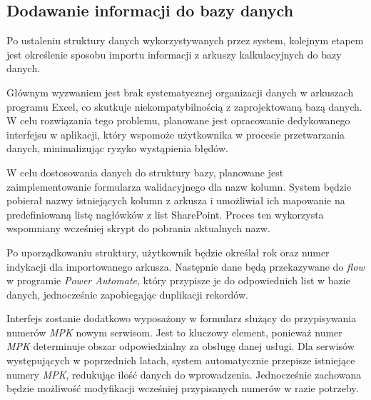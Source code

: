 \subsection{Dodawanie informacji do bazy danych}
Po ustaleniu struktury danych wykorzystywanych przez system, kolejnym etapem jest określenie sposobu importu informacji z arkuszy kalkulacyjnych do bazy danych.

Głównym wyzwaniem jest brak systematycznej organizacji danych w arkuszach programu Excel, co skutkuje niekompatybilnością z zaprojektowaną bazą danych. W celu rozwiązania tego problemu, planowane jest opracowanie dedykowanego interfejsu w aplikacji, który wspomoże użytkownika w procesie przetwarzania danych, minimalizując ryzyko wystąpienia błędów.



W celu dostosowania danych do struktury bazy, planowane jest zaimplementowanie formularza walidacyjnego dla nazw kolumn. System będzie pobierał nazwy istniejących kolumn z arkusza i umożliwiał ich mapowanie na predefiniowaną listę nagłówków z list SharePoint. Proces ten wykorzysta wspomniany wcześniej skrypt do pobrania aktualnych nazw.

Po uporządkowaniu struktury, użytkownik będzie określał rok oraz numer indykacji dla importowanego arkusza. Następnie dane będą przekazywane do \emph{flow} w programie \emph{Power Automate}, który przypisze je do odpowiednich list w bazie danych, jednocześnie zapobiegając duplikacji rekordów.

Interfejs zostanie dodatkowo wyposażony w formularz służący do przypisywania numerów \emph{MPK} nowym serwisom. Jest to kluczowy element, ponieważ numer \emph{MPK} determinuje obszar odpowiedzialny za obsługę danej usługi. Dla serwisów występujących w poprzednich latach, system automatycznie przepisze istniejące numery \emph{MPK}, redukując ilość danych do wprowadzenia. Jednocześnie zachowana będzie możliwość modyfikacji wcześniej przypisanych numerów w razie potrzeby.

